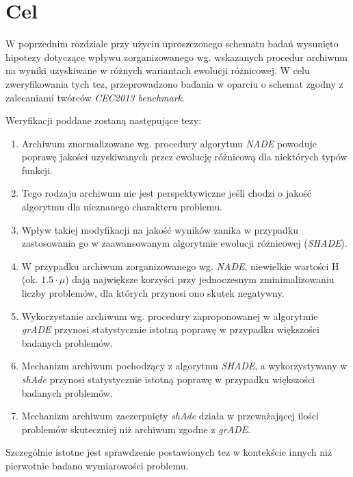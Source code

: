 \documentclass[12pt,a4paper]{report}
\begin{document}
{{{{{{{\section{Cel}
\label{CelHipotezy}
\par{
W poprzednim rozdziale przy użyciu uproszczonego schematu badań wysunięto hipotezy dotyczące wpływu zorganizowanego wg. wskazanych procedur archiwum na wyniki uzyskiwane w różnych wariantach ewolucji różnicowej. W celu zweryfikowania tych tez, przeprowadzono badania w oparciu o schemat zgodny z zalecaniami twórców \emph{CEC2013 benchmark}.
}
\par{
Weryfikacji poddane zostaną następujące tezy:
\begin{enumerate}
\item Archiwum znormalizowane wg. procedury algorytmu \emph{NADE} powoduje poprawę jakości uzyskiwanych przez ewolucję różnicową dla niektórych typów funkcji.
\item Tego rodzaju archiwum nie jest perspektywiczne jeśli chodzi o jakość algorytmu dla nieznanego charakteru problemu.
\item Wpływ takiej modyfikacji na jakość wyników zanika w przypadku zastosowania go w zaawansowanym algorytmie ewolucji różnicowej (\emph{SHADE}).
\item W przypadku archiwum zorganizowanego wg. \emph{NADE}, niewielkie wartości H (ok. $1.5 \cdot \mu$) dają największe korzyści przy jednoczesnym zminimalizowaniu liczby problemów, dla których przynosi ono skutek negatywny.
\item Wykorzystanie archiwum wg. procedury zaproponowanej w algorytmie \emph{grADE} przynosi statystycznie istotną poprawę w przypadku większości badanych problemów.
\item Mechanizm archiwum pochodzący z algorytmu \emph{SHADE}, a wykorzystywany w \emph{shAde} przynosi statystycznie istotną poprawę w przypadku większości badanych problemów.
\item Mechanizm archiwum zaczerpnięty \emph{shAde} działa w przeważającej ilości problemów skuteczniej niż archiwum zgodne z \emph{grADE}.
\end{enumerate}
}
\par{
Szczególnie istotne jest sprawdzenie postawionych tez w kontekście innych niż pierwotnie badano wymiarowości problemu.
}

}}}}}}}
\end{document}
